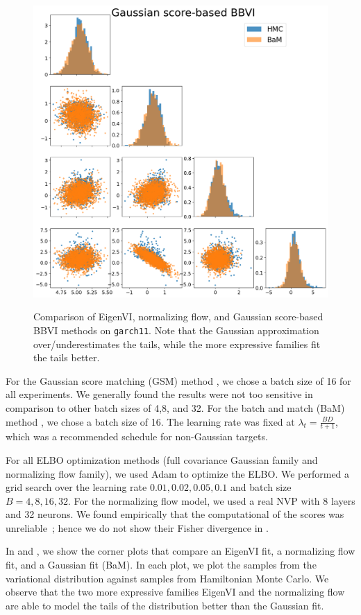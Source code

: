 \begin{figure}
    \\
    \includegraphics[scale=0.23]{figs/expts-pdb/PDB_99_samples_bam.png}
    \caption{Comparison of EigenVI, normalizing flow,
    and Gaussian score-based BBVI methods on
\texttt{garch11}.
Note that the Gaussian approximation over/underestimates the tails,
while the more expressive families fit the tails better.
    }
\label{fig:garch11:corner}
\end{figure}


For the Gaussian score matching (GSM) method \citep{modi2023},
we chose a batch size of 16 for all experiments. We generally found the
results were not too sensitive in comparison to other batch sizes of 4,8, and 32.
For the batch and match (BaM) method \citep{cai2024}, we chose a batch size of 16.
The learning rate was fixed at
$\lambda_t = \tfrac{BD}{t+1}$, which was a recommended schedule for non-Gaussian targets.

For all ELBO optimization methods (full covariance Gaussian family and normalizing flow family),
we used Adam to optimize the ELBO.
We performed a grid search over the learning rate
$0.01, 0.02, 0.05, 0.1$ and batch size $B=4,8,16,32$.
For the normalizing flow model,
we used a real NVP \citep{dinh2016density}
with 8 layers and 32 neurons.
We found empirically that the computational of the scores was unreliable~\cite{kohler2021smooth,
Zeghal2022npe};
hence we do not show their Fisher divergence in .


In 
and
,
we show the corner plots that compare an EigenVI fit, a normalizing flow fit, and a Gaussian fit
(BaM).
In each plot, we plot the samples from the variational distribution against
samples from Hamiltonian Monte Carlo.
We observe that the two more expressive families EigenVI and the normalizing flow
are able to model the tails of the distribution better than the Gaussian fit.

%

